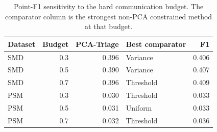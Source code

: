 \begin{table}[t]
\centering
\caption{Point-F1 sensitivity to the hard communication budget. The comparator column is the strongest non-PCA constrained method at that budget.}
\begin{tabular}{@{}lrrlr@{}}
\toprule
Dataset & Budget & PCA-Triage & Best comparator & F1 \\
\midrule
SMD & 0.3 & 0.396 & Variance & 0.406 \\
SMD & 0.5 & 0.390 & Variance & 0.407 \\
SMD & 0.7 & 0.396 & Threshold & 0.409 \\
\addlinespace
PSM & 0.3 & 0.030 & Threshold & 0.033 \\
PSM & 0.5 & 0.031 & Uniform & 0.033 \\
PSM & 0.7 & 0.032 & Threshold & 0.036 \\
\bottomrule
\end{tabular}
\label{tab:budget-sensitivity}
\end{table}

\begin{table}[t]
\centering
\caption{Run-separated TEP results at 50\% bandwidth, with the fault onset labeled within each run. Values are mean $\pm$ standard deviation across five joint experimental seeds.}
\label{tab:causal-tep}
\end{table}

